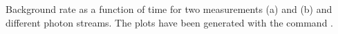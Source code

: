 \label{fig:bg_timetrace} Background rate as a function of time for two measurements (a) and (b) and different photon streams. The plots have been generated with the command .